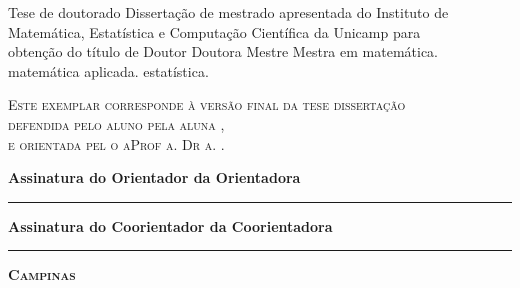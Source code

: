 \vspace{.5cm}
\begin{flushright}
    \begin{minipage}[c]{.8\textwidth}
        \begin{flushright}
            \ifx\mestrado\undefined
            Tese de doutorado
            \else
            Disserta\c{c}\~{a}o de mestrado
            \fi
            apresentada do Instituto de \\ Matem\'atica,
            Estat\'istica e Computa\c c\~ao Cient\'ifica
            da Unicamp para \\ obten\c c\~ao do t\'itulo de
            \ifx\mestrado\undefined
                \ifx\femaleAuthor\undefined
                Doutor
                \else
                Doutora
                \fi
            \else
                \ifx\femaleAuthor\undefined
                Mestre
                \else
                Mestra
                \fi
            \fi
            em
            \ifx\matematica\undefined
            \else
            matem\'{a}tica.
            \fi
            \ifx\aplicada\undefined
            \else
            matem\'{a}tica aplicada.
            \fi
            \ifx\estatistica\undefined
            \else
            estat\'{i}stica.
            \fi
        \end{flushright}
    \end{minipage}
\end{flushright}
\vspace{.5cm}
\noindent
{\footnotesize \scshape
Este exemplar corresponde \`a vers\~ao final da 
\ifx\mestrado\undefined
tese
\else
disserta\c{c}\~{a}o
\fi \\
defendida 
\ifx\femaleAuthor\undefined
pelo aluno
\else
pela aluna
\fi
\autor,\\
e orientada pel\ifx\femaleOrientador\undefined
o\else
a\fi Prof\ifx\femaleOrientador\undefined
\else
a\fi. Dr\ifx\femaleOrientador\undefined
\else
a\fi. \orientador.
}
\vspace{1cm}

\noindent
{\small \bfseries
\noindent
Assinatura
\ifx\femaleOrientador\undefined
do Orientador
\else
da Orientadora
\fi

\vspace{.7cm}
\noindent
\rule[1pt]{7cm}{.5pt}  %
}
\vspace{.5cm}


\ifx\coorientador\undefined
\else
{\small \bfseries
\noindent
Assinatura
\ifx\femaleCoorientador\undefined
do Coorientador
\else
da Coorientadora
\fi

\vspace{.7cm}
\noindent
\rule[1pt]{7cm}{.5pt}  %
}
\fi
\vfill
\begin{center}
    {\small \scshape \bfseries Campinas \\ \ano}
\end{center}

